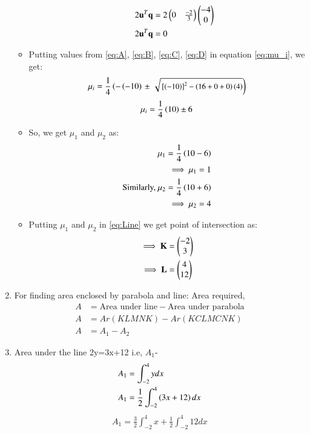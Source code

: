 \documentclass[journal,12pt,twocolumn]{IEEEtran}
\begin{document}
\begin{enumerate}
\begin{itemize}
\begin{enumerate}[label=\alph*.]
\begin{align}
2\mathbf{u}^T\mathbf{q}&=2\begin{pmatrix}0&\frac{-2}{3}\end{pmatrix} \begin{pmatrix}-4\\0\end{pmatrix}
\\
2\mathbf{u}^T\mathbf{q}&=0\label{eq:D}
\end{align}
\end{enumerate}
\item Putting values from \eqref{eq:A}, \eqref{eq:B}, \eqref{eq:C}, \eqref{eq:D} in equation \eqref{eq:mu_i}, we get:
\begin{multline}
\mu_i = \frac{1}{4}
\left(-\left(-10\right)\right.
\pm
{\small
\ensuremath{\left.\sqrt{
{}\left[\left(-10\right)\right]^2-\left(16 +0+0\right)\left(4\right)}\right)}}
\end{multline}
\begin{align}
\mu_i = \frac{1}{4}
\left(10\right)
\pm{6}
\end{align}
\item So, we get $\mu_1$ and $\mu_2$ as:
\begin{align}
\mu_1 = \frac{1}{4}\left(10-6\right)
\\
\implies \mu_1 = 1
\\
\text{Similarly, }\mu_2 = \frac{1}{4}\left(10+6\right)
\\
\implies \mu_2 =4
\end{align}
\item Putting $\mu_1$ and $\mu_2$ in \eqref{eq:Line} we get point of intersection as:
\begin{align}
\implies \mathbf{K}&= \begin{pmatrix}-2\\3\end{pmatrix}  
\\
\implies \mathbf{L}&= \begin{pmatrix}4\\12\end{pmatrix}
\end{align}
\end{itemize}
\item For finding area enclosed by parabola and line:
  Area required,
\begin{align}
   A&= \text{Area under line} - \text{Area under parabola}
     \\
   A&= Ar(KLMNK)-Ar(KCLMCNK)
    \\
    A&= A_1 -A_2 \label{eqAREA}
    \end{align}
\item Area under the line 2y=3x+12 i.e, $A_1$-
\begin{align}
  A_1&= \int_{-2}^{4} y dx
    \\
    A_1&= \frac{1}{2}\int_{-2}^{4} \left(3x+12\right) dx
    \end{align}
    \begin{align}
    A_1= \frac{3}{2}\int_{-2}^{4} x+\frac{1}{2}\int_{-2}^{4}12 dx

\end{align}
\end{enumerate}
\end{document}
